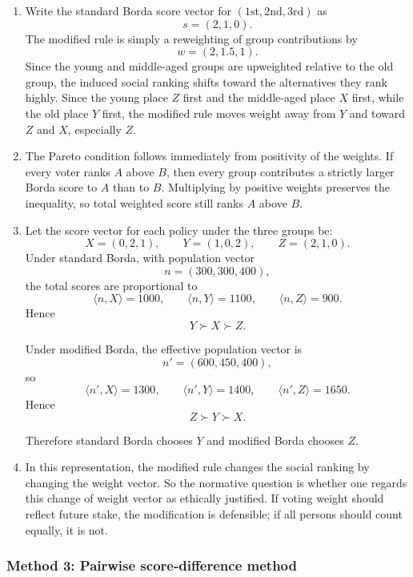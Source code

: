 \documentclass[12pt]{article}
\begin{document}
\begin{enumerate}[label=(\alph*)]
    \item
    Write the standard Borda score vector for \((\text{1st},\text{2nd},\text{3rd})\) as
    \[
    s=(2,1,0).
    \]
    The modified rule is simply a reweighting of group contributions by
    \[
    w=(2,1.5,1).
    \]
    Since the young and middle-aged groups are upweighted relative to the old group, the induced social ranking shifts toward the alternatives they rank highly. Since the young place \(Z\) first and the middle-aged place \(X\) first, while the old place \(Y\) first, the modified rule moves weight away from \(Y\) and toward \(Z\) and \(X\), especially \(Z\).

    \item
    The Pareto condition follows immediately from positivity of the weights. If every voter ranks \(A\) above \(B\), then every group contributes a strictly larger Borda score to \(A\) than to \(B\). Multiplying by positive weights preserves the inequality, so total weighted score still ranks \(A\) above \(B\).

    \item
    Let the score vector for each policy under the three groups be:
    \[
    X=(0,2,1),\qquad Y=(1,0,2),\qquad Z=(2,1,0).
    \]
    Under standard Borda, with population vector
    \[
    n=(300,300,400),
    \]
    the total scores are proportional to
    \[
    \langle n,X\rangle =1000,\qquad
    \langle n,Y\rangle =1100,\qquad
    \langle n,Z\rangle =900.
    \]
    Hence
    \[
    \boxed{Y \succ X \succ Z.}
    \]

    Under modified Borda, the effective population vector is
    \[
    n'=(600,450,400),
    \]
    so
    \[
    \langle n',X\rangle =1300,\qquad
    \langle n',Y\rangle =1400,\qquad
    \langle n',Z\rangle =1650.
    \]
    Hence
    \[
    \boxed{Z \succ Y \succ X.}
    \]

    Therefore standard Borda chooses \(Y\) and modified Borda chooses \(Z\).

    \item
    In this representation, the modified rule changes the social ranking by changing the weight vector. So the normative question is whether one regards this change of weight vector as ethically justified. If voting weight should reflect future stake, the modification is defensible; if all persons should count equally, it is not.
\end{enumerate}

\newpage
\subsubsection{Method 3: Pairwise score-difference method}
\end{document}
